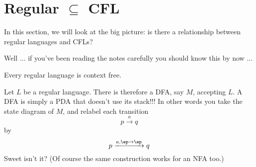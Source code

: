 \section{Regular $\subseteq$ CFL}

In this section, we will look at the big picture:
is there a relationship between regular languages and CFLs?

Well ... if you've been reading the notes carefully you should
know this by now ...

\begin{thm}
Every regular language is context free.
\end{thm}

Let $L$ be a regular language.
There is therefore a DFA, say $M$, accepting $L$.
A DFA is simply a PDA that doesn't use its stack!!!
In other words you take the state diagram of $M$, and relabel each transition
\[
p \xrightarrow{a} q
\]
by
\[
p \xrightarrow{a, \ep \rightarrow \ep} q
\]
Sweet isn't it? 
(Of course the same construction works for an NFA too.)
